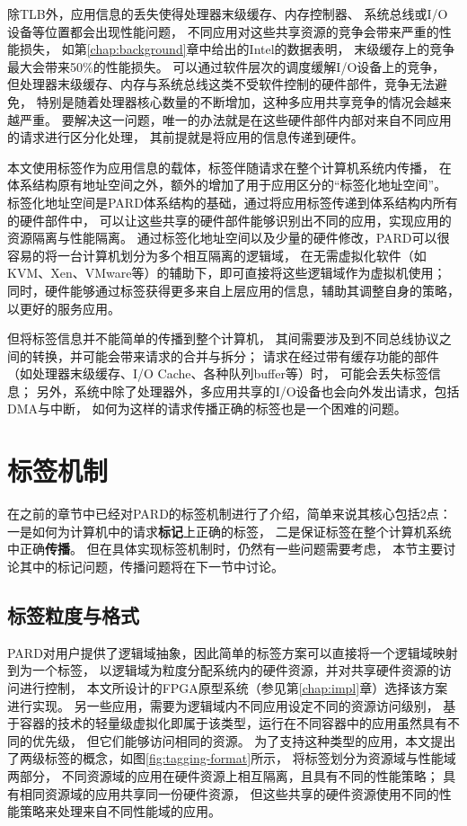 除TLB外，应用信息的丢失使得处理器末级缓存、内存控制器、
系统总线或I/O设备等位置都会出现性能问题，
不同应用对这些共享资源的竞争会带来严重的性能损失，
如第\ref{chap:background}章中给出的Intel的数据表明，
末级缓存上的竞争最大会带来50\%的性能损失\cite{Christine:2014}。
可以通过软件层次的调度缓解I/O设备上的竞争，
但处理器末级缓存、内存与系统总线这类不受软件控制的硬件部件，竞争无法避免，
特别是随着处理器核心数量的不断增加，这种多应用共享竞争的情况会越来越严重。
要解决这一问题，唯一的办法就是在这些硬件部件内部对来自不同应用的请求进行区分化处理，
其前提就是将应用的信息传递到硬件。

本文使用标签作为应用信息的载体，标签伴随请求在整个计算机系统内传播，
在体系结构原有地址空间之外，额外的增加了用于应用区分的``标签化地址空间''。
标签化地址空间是PARD体系结构的基础，通过将应用标签传递到体系结构内所有的硬件部件中，
可以让这些共享的硬件部件能够识别出不同的应用，实现应用的资源隔离与性能隔离。
通过标签化地址空间以及少量的硬件修改，PARD可以很容易的将一台计算机划分为多个相互隔离的逻辑域，
在无需虚拟化软件（如KVM、Xen、VMware等）的辅助下，即可直接将这些逻辑域作为虚拟机使用；
同时，硬件能够通过标签获得更多来自上层应用的信息，辅助其调整自身的策略，以更好的服务应用。

但将标签信息并不能简单的传播到整个计算机，
其间需要涉及到不同总线协议之间的转换，并可能会带来请求的合并与拆分；
请求在经过带有缓存功能的部件（如处理器末级缓存、I/O Cache、各种队列buffer等）时，
可能会丢失标签信息；
另外，系统中除了处理器外，多应用共享的I/O设备也会向外发出请求，包括DMA与中断，
如何为这样的请求传播正确的标签也是一个困难的问题。


\section{标签机制}

在之前的章节中已经对PARD的标签机制进行了介绍，简单来说其核心包括2点：
一是如何为计算机中的请求\textbf{标记}上正确的标签，
二是保证标签在整个计算机系统中正确\textbf{传播}。
但在具体实现标签机制时，仍然有一些问题需要考虑，
本节主要讨论其中的标记问题，传播问题将在下一节中讨论。


\subsection{标签粒度与格式}

PARD对用户提供了逻辑域抽象，因此简单的标签方案可以直接将一个逻辑域映射到为一个标签，
以逻辑域为粒度分配系统内的硬件资源，并对共享硬件资源的访问进行控制，
本文所设计的FPGA原型系统（参见第\ref{chap:impl}章）选择该方案进行实现。
另一些应用，需要为逻辑域内不同应用设定不同的资源访问级别，
基于容器的技术的轻量级虚拟化即属于该类型，运行在不同容器中的应用虽然具有不同的优先级，
但它们能够访问相同的资源。
为了支持这种类型的应用，本文提出了两级标签的概念，如图\ref{fig:tagging-format}所示，
将标签划分为资源域与性能域两部分，
不同资源域的应用在硬件资源上相互隔离，且具有不同的性能策略；
具有相同资源域的应用共享同一份硬件资源，
但这些共享的硬件资源使用不同的性能策略来处理来自不同性能域的应用。

